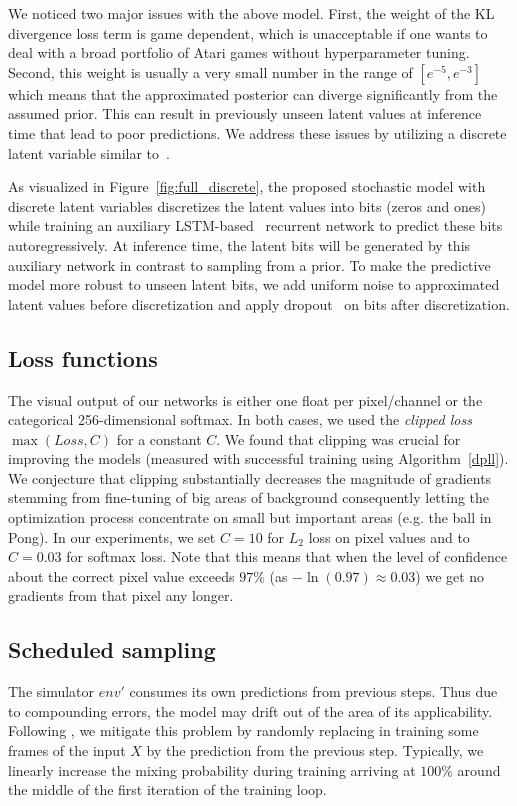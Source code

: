 We noticed two major issues with the above model. First, the weight of the KL divergence loss term is game dependent, which is unacceptable if one wants to deal with a broad portfolio of Atari games without hyperparameter tuning. Second, this weight is usually a very small number in the range of $[e^{-5}, e^{-3}]$ which means that the approximated posterior can diverge significantly from the assumed prior. This can result in previously unseen latent values at inference time that lead to poor predictions. We address these issues by utilizing a discrete latent variable similar to~\citet{auto_discrete}.

As visualized in Figure~\ref{fig:full_discrete}, the proposed stochastic model with discrete latent variables discretizes the latent values into bits (zeros and ones) while training an auxiliary LSTM-based~\cite{hochreiter1997long} recurrent network to predict these bits autoregressively. At inference time, the latent bits will be generated by this auxiliary network in contrast to sampling from a prior. To make the predictive model more robust to unseen latent bits, we add uniform noise to approximated latent values before discretization and apply dropout~\cite{srivastava2014dropout} on bits after discretization.

\subsection{Loss functions}
The visual output of our networks is either one float per pixel/channel or the categorical 256-dimensional softmax. In both cases, we used the \textit{clipped loss} $\max(Loss, C)$ for a constant $C$. We found that clipping was crucial for improving the models (measured with successful training using Algorithm~\ref{dpll}). We conjecture that clipping substantially decreases the magnitude of gradients stemming from fine-tuning of big areas of background consequently letting the optimization process concentrate on small but important areas (e.g. the ball in Pong). In our experiments, we set $C=10$ for $L_2$ loss on pixel values and to $C=0.03$ for softmax loss.
Note that this means that when the level of confidence about the correct pixel value exceeds $97\%$  (as $-\ln(0.97) \approx 0.03$) we get no gradients from that pixel any longer.

\subsection{Scheduled sampling}
The simulator $env'$ consumes its own predictions from previous steps. Thus due to compounding errors, the model may drift out of the area of its applicability. Following \cite{BengioVJS15,venkatraman}, we mitigate this problem by randomly replacing in training some frames of the input $X$ by the prediction from the previous step. Typically, we linearly increase the mixing probability during training arriving at $100\%$ around the middle of the first iteration of the training loop.

